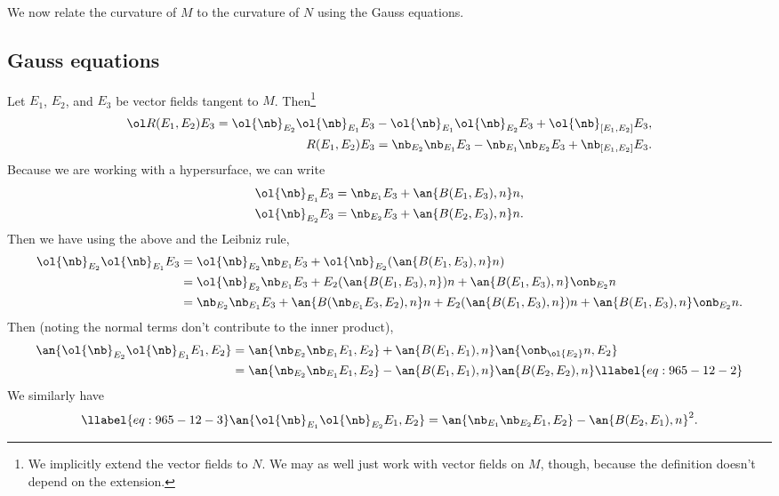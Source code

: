 We now relate the curvature of $M$ to the curvature of $N$ using the Gauss equations.
\subsection{Gauss equations}
Let $E_1$, $E_2$, and $E_3$ be vector fields tangent to $M$. Then\footnote{We implicitly extend the vector fields to $N$. We may as well just work with vector fields on $M$, though, because the definition doesn't depend on the extension.}
\begin{align*}
\ol R(E_1,E_2)E_3=\ol{\nb}_{E_2}\ol{\nb}_{E_1}E_3-\ol{\nb}_{E_1} \ol{\nb}_{E_2} E_3+\ol{\nb}_{[E_1,E_2]} E_3,\\
R(E_1,E_2)E_3={\nb}_{E_2}{\nb}_{E_1}E_3-{\nb}_{E_1} {\nb}_{E_2} E_3+{\nb}_{[E_1,E_2]} E_3.
\end{align*}
Because we are working with a hypersurface, we can write
\begin{align*}
\ol{\nb}_{E_1}E_3 &= \nb_{E_1}E_3 + \an{B(E_1,E_3),n}n,\\
\ol{\nb}_{E_2}E_3 &= \nb_{E_2}E_3 + \an{B(E_2,E_3),n}n.
\end{align*}
Then we have using the above and the Leibniz rule,
\begin{align*}
\ol{\nb}_{E_2}\ol{\nb}_{E_1}E_3
&=\ol{\nb}_{E_2}{\nb}_{E_1} E_3+\ol{\nb}_{E_2}(\an{B(E_1,E_3),n}n)\\
&=\ol{\nb}_{E_2}\nb_{E_1}{E_3}+E_2 (\an{B(E_1,E_3),n})n + \an{B(E_1,E_3),n} \onb_{{E_2}}n\\
&=\nb_{E_2}\nb_{E_1} E_3 +\an{B({\nb}_{E_1}E_3,E_2),n}n + E_2 (\an{B(E_1,E_3),n})n +\an{B(E_1,E_3),n}\onb_{{E_2}} n.
\end{align*}
Then (noting the normal terms don't contribute to the inner product),
\begin{align}
\nonumber
\an{\ol{\nb}_{E_2}\ol{\nb}_{E_1} E_1,E_2}
&=\an{\nb_{E_2}\nb_{E_1} E_1,E_2}
+\an{B(E_1,E_1),n}\an{\onb_{\ol{E_2}} n,E_2}\\
&=\an{\nb_{E_2}\nb_{E_1}E_1,E_2} - \an{B(E_1,E_1),n} \an{B(E_2,E_2),n}
\llabel{eq:965-12-2}
\end{align}
We similarly have %
\begin{equation}\llabel{eq:965-12-3}
\an{\ol{\nb}_{E_1}\ol{\nb}_{E_2} E_1,E_2}=\an{\nb_{E_1}\nb_{E_2}E_1,E_2} -\an{B(E_2,E_1),n}^2.
\end{equation}
